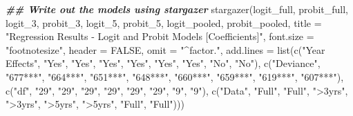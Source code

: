 \documentclass[a4paper,nobind]{templates/ociamthesis}
\newenvironment{Shaded}{\begin{snugshade}}{\end{snugshade}}
\newcommand{\AttributeTok}[1]{\textcolor[rgb]{0.77,0.63,0.00}{#1}}
\newcommand{\ConstantTok}[1]{\textcolor[rgb]{0.00,0.00,0.00}{#1}}
\newcommand{\DocumentationTok}[1]{\textcolor[rgb]{0.56,0.35,0.01}{\textbf{\textit{#1}}}}
\newcommand{\FunctionTok}[1]{\textcolor[rgb]{0.00,0.00,0.00}{#1}}
\newcommand{\NormalTok}[1]{#1}
\newcommand{\StringTok}[1]{\textcolor[rgb]{0.31,0.60,0.02}{#1}}
\renewenvironment{Shaded}
{
  \vspace{10pt}%
  \begin{snugshade}%
}{%
  \end{snugshade}%
  \vspace{8pt}%
}
\begin{document}
\newpage

\blandscape

\begin{Shaded}
\begin{Highlighting}[]
\DocumentationTok{\#\# Write out the models using stargazer}
\FunctionTok{stargazer}\NormalTok{(logit\_full, probit\_full, logit\_3, probit\_3, logit\_5, probit\_5, logit\_pooled, probit\_pooled, }\AttributeTok{title =} \StringTok{"Regression Results {-} Logit and Probit Models [Coefficients]"}\NormalTok{, }\AttributeTok{font.size =} \StringTok{"footnotesize"}\NormalTok{, }\AttributeTok{header =} \ConstantTok{FALSE}\NormalTok{, }\AttributeTok{omit =} \StringTok{"\^{}factor."}\NormalTok{, }\AttributeTok{add.lines =} \FunctionTok{list}\NormalTok{(}\FunctionTok{c}\NormalTok{(}\StringTok{"Year Effects"}\NormalTok{, }\StringTok{"Yes"}\NormalTok{, }\StringTok{"Yes"}\NormalTok{, }\StringTok{"Yes"}\NormalTok{, }\StringTok{"Yes"}\NormalTok{, }\StringTok{"Yes"}\NormalTok{, }\StringTok{"Yes"}\NormalTok{, }\StringTok{"No"}\NormalTok{, }\StringTok{"No"}\NormalTok{),}
\FunctionTok{c}\NormalTok{(}\StringTok{"Deviance"}\NormalTok{, }\StringTok{"677***"}\NormalTok{, }\StringTok{"664***"}\NormalTok{, }\StringTok{"651***"}\NormalTok{, }\StringTok{"648***"}\NormalTok{, }\StringTok{"660***"}\NormalTok{, }\StringTok{"659***"}\NormalTok{, }\StringTok{"619***"}\NormalTok{, }\StringTok{"607***"}\NormalTok{), }\FunctionTok{c}\NormalTok{(}\StringTok{"df"}\NormalTok{, }\StringTok{"29"}\NormalTok{, }\StringTok{"29"}\NormalTok{, }\StringTok{"29"}\NormalTok{, }\StringTok{"29"}\NormalTok{, }\StringTok{"29"}\NormalTok{, }\StringTok{"29"}\NormalTok{, }\StringTok{"9"}\NormalTok{, }\StringTok{"9"}\NormalTok{),}
\FunctionTok{c}\NormalTok{(}\StringTok{"Data"}\NormalTok{, }\StringTok{"Full"}\NormalTok{, }\StringTok{"Full"}\NormalTok{, }\StringTok{"\textgreater{}3yrs"}\NormalTok{, }\StringTok{"\textgreater{}3yrs"}\NormalTok{, }\StringTok{"\textgreater{}5yrs"}\NormalTok{, }\StringTok{"\textgreater{}5yrs"}\NormalTok{, }\StringTok{"Full"}\NormalTok{, }\StringTok{"Full"}\NormalTok{)))}
\end{Highlighting}
\end{Shaded}
\end{document}
